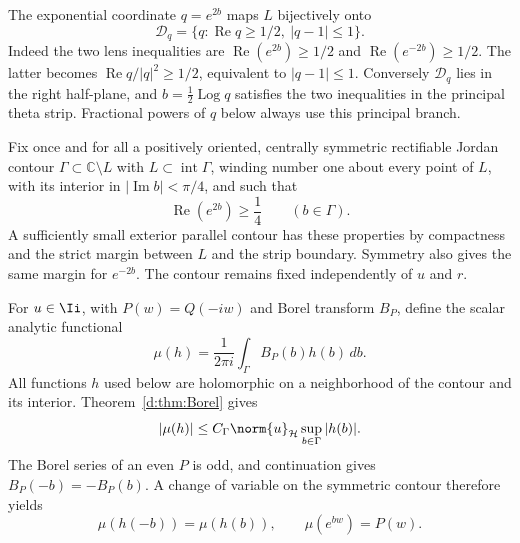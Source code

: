 \documentclass[11pt,a4paper]{article}
\numberwithin{equation}{section}
\theoremstyle{definition}\newtheorem{definition}[theorem]{Definition}
\theoremstyle{remark}\newtheorem{remark}[theorem]{Remark}
\newcommand{\Hh}{\mathcal H}\newcommand{\Hw}{\mathcal H}
\begin{document}
The exponential coordinate $q=e^{2b}$ maps $L$ bijectively onto
\begin{equation}\label{d:eq:q-domain}
 \mathcal D_q=\{q:\operatorname{Re}q\ge1/2,\ |q-1|\le1\}.
\end{equation}
Indeed the two lens inequalities are
$\operatorname{Re}(e^{2b})\ge1/2$ and
$\operatorname{Re}(e^{-2b})\ge1/2$. The latter becomes
$\operatorname{Re}q/|q|^2\ge1/2$, equivalent to $|q-1|\le1$.
Conversely $\mathcal D_q$ lies in the right half-plane, and
$b=\frac12\operatorname{Log}q$ satisfies the two inequalities in the principal theta strip. Fractional powers of $q$ below always use this principal branch.

Fix once and for all a positively oriented, centrally symmetric rectifiable Jordan contour $\Gamma\subset\mathbb C\setminus L$ with $L\subset\operatorname{int}\Gamma$, winding number one about every point of $L$, with its interior in $|\operatorname{Im}b|<\pi/4$, and such that
\begin{equation}\label{d:eq:fixed-contour-margin}
 \operatorname{Re}(e^{2b})\ge\frac14\qquad(b\in\Gamma).
\end{equation}
A sufficiently small exterior parallel contour has these properties by compactness and the strict margin between $L$ and the strip boundary. Symmetry also gives the same margin for $e^{-2b}$. The contour remains fixed independently of $u$ and $r$.

For $u\in\Ii$, with $P(w)=Q(-iw)$ and Borel transform $B_P$, define the scalar analytic functional
\begin{equation}\label{d:eq:mu-functional}
 \mu(h)=\frac1{2\pi i}\int_\Gamma B_P(b)h(b)\,db.
\end{equation}
All functions $h$ used below are holomorphic on a neighborhood of the contour and its interior. Theorem~\ref{d:thm:Borel} gives
\begin{equation}\label{d:eq:mu-bound}
 |\mu(h)|\le C_\Gamma\norm{u}_{\Hh}\sup_{b\in\Gamma}|h(b)|.
\end{equation}
The Borel series of an even $P$ is odd, and continuation gives
$B_P(-b)=-B_P(b)$. A change of variable on the symmetric contour therefore yields
\begin{equation}\label{d:eq:mu-symmetry}
 \mu(h(-b))=\mu(h(b)),\qquad \mu(e^{bw})=P(w).
\end{equation}
\end{document}
